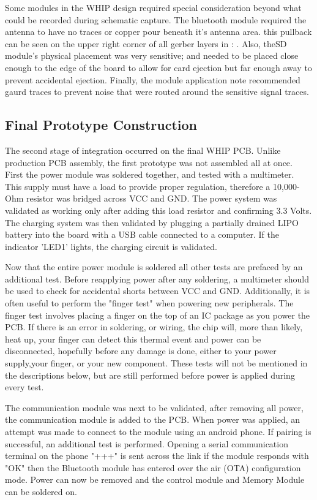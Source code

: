 Some modules in the WHIP design required special consideration beyond what could be recorded during schematic capture. The bluetooth module required the antenna to have no traces or copper pour beneath it's antenna area. this pullback can be seen on the upper right corner of all gerber layers in  : . Also, theSD module's physical placement was very sensitive; and needed to be placed close enough to the edge of the board to allow for card ejection but far enough away to prevent accidental ejection. Finally, the  module application note recommended gaurd traces to prevent noise that were routed around the sensitive signal traces. 


\subsection {Final Prototype Construction}
The second stage of integration occurred on the final WHIP PCB. Unlike production PCB assembly, the first prototype was not assembled all at once. First the power module was soldered together, and tested with a multimeter. This supply must have a load to provide proper regulation, therefore a 10,000-Ohm resistor was bridged across VCC and GND. The power system was validated as working only after adding this load resistor and confirming 3.3 Volts. The charging system was then validated by plugging a partially drained LIPO battery into the board with a USB cable connected to a computer. If the indicator 'LED1' lights, the charging circuit is validated. 

Now that the entire power module is soldered all other tests are prefaced by an additional test. Before reapplying power after any soldering, a multimeter should be used to check for accidental shorts between VCC and GND. Additionally, it is often useful to perform the "finger test" when powering new peripherals. The finger test involves placing a finger on the top of an IC package as you power the PCB. If there is an error in soldering, or wiring, the chip will, more than likely, heat up, your finger can detect this thermal event and power can be disconnected, hopefully before any damage is done, either to your power supply,your finger, or your new component. These tests will not be mentioned in the descriptions below, but are still performed before power is applied during every test.

The communication module was next to be validated, after removing all power, the communication module is added to the PCB. When power was applied, an attempt was made to connect to the module using an android phone. If pairing is successful, an additional test is performed. Opening a serial communication terminal on the phone "+++" is sent across the link if the module responds with "OK" then the Bluetooth module has entered over the air (OTA) configuration mode. Power can now be removed and the control module and Memory Module can be soldered on. 

